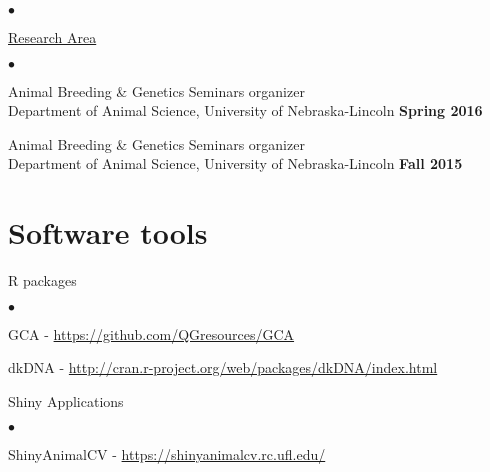 \documentclass[margin,line,10pt]{res}
\newenvironment{list1}{
  \begin{list}{\ding{113}}{%
      \setlength{\itemsep}{0in}
      \setlength{\parsep}{0in} \setlength{\parskip}{0in}
      \setlength{\topsep}{0in} \setlength{\partopsep}{0in} 
      \setlength{\leftmargin}{0.17in}}}{\end{list}}
\newenvironment{list2}{
  \begin{list}{$\bullet$}{%
      \setlength{\itemsep}{0in}
      \setlength{\parsep}{0in} \setlength{\parskip}{0in}
      \setlength{\topsep}{0in} \setlength{\partopsep}{0in} 
      \setlength{\leftmargin}{0.2in}}}{\end{list}}
\begin{document}
\begin{resume}
\begin{list2}
\end{list2}


\begin{flushleft}
\hspace{0.3cm} \underline{Research Area}
\end{flushleft}
\begin{list2}
\item Animal Breeding \& Genetics Seminars organizer \\
  Department of Animal Science, University of Nebraska-Lincoln   \hfill \textbf{Spring 2016}\\

\item Animal Breeding \& Genetics Seminars organizer \\
  Department of Animal Science, University of Nebraska-Lincoln   \hfill \textbf{Fall 2015}\\
\end{list2}






\vspace{0.5cm}
\section{\sc Software tools} 
\begin{list1}
\item[] R packages
\begin{list2}
  \item GCA - \textcolor{blue}{\href{https://github.com/QGresources/GCA}{https://github.com/QGresources/GCA}}

  \vspace{0.3cm}

\item dkDNA - \textcolor{blue}{\href{http://cran.r-project.org/web/packages/dkDNA/index.html}{http://cran.r-project.org/web/packages/dkDNA/index.html}}
\end{list2}


\vspace{0.3cm}
\item[] Shiny Applications
  \begin{list2}
    \item ShinyAnimalCV - \textcolor{blue}{\href{https://shinyanimalcv.rc.ufl.edu/}{https://shinyanimalcv.rc.ufl.edu/}}

    \vspace{0.3cm}


\end{list2}
\end{list1}
\end{resume}
\end{document}
